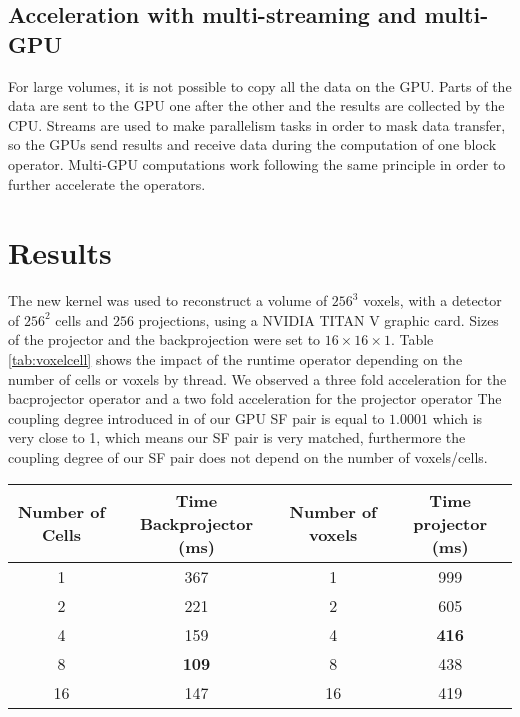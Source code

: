 \documentclass[12pt]{spieman}  %
\begin{document}
\begin{spacing}{1}
\begin{algorithm}
\begin{algorithmic}
\end{algorithmic}
\end{algorithm}

\subsection{Acceleration with multi-streaming and multi-GPU}
For large volumes, it is not possible to copy all the data on the GPU.  Parts of the data are sent to the GPU one after the other and the results are collected by the CPU. Streams are used to make parallelism tasks in order to mask data transfer, so the GPUs send results and receive data during the computation of one block operator. Multi-GPU computations work following the same principle in order to further accelerate the operators.

\section{Results}
The new kernel was used to reconstruct a volume of $256^3$ voxels, with a detector of $256^2$ cells and $256$ projections, using a NVIDIA TITAN V graphic card. Sizes of the projector and the backprojection were set to $16 \times 16 \times 1$. Table \ref{tab:voxelcell} shows the impact of the runtime operator depending on the number of cells or voxels by thread. We observed a three fold acceleration for the bacprojector operator and a two fold acceleration for the projector operator
The coupling degree introduced in \cite{arcadu2016crucial} of our GPU SF pair is equal to $1.0001$ which is very close to 1, which means our SF pair is very matched, furthermore the coupling degree of our SF pair does not depend on the number of voxels/cells.
\begin{table}[h]
\centering
 \begin{tabular}{||c c | c c||} 
  \hline
Number of Cells & Time Backprojector (ms) & Number of voxels &Time projector  (ms) \\
 \hline\hline
 1 & 367 & 1 & 999 \\ 
 \hline
 2 & 221 & 2 & 605\\
 \hline
 4 & 159 & 4 &\textbf{416} \\
 \hline
 8 & \textbf{109} & 8 &438\\ 
 \hline
  16 & 147 & 16 & 419 \\  

\end{tabular}
\end{table}
\end{spacing}
\end{document}
